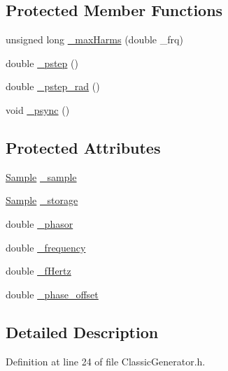\subsection*{Protected Member Functions}
\begin{DoxyCompactItemize}
\item 
unsigned long \hyperlink{classSignal_1_1ClassicGenerator_a7457e912d428de4e3fc27ec7fc49890e}{\+\_\+max\+Harms} (double \+\_\+frq)
\item 
double \hyperlink{classSignal_1_1ClassicGenerator_a255330ce8049b6e6d101b8d356cebe3d}{\+\_\+pstep} ()
\item 
double \hyperlink{classSignal_1_1ClassicGenerator_a6571276f584ff0be3862243d0f103a92}{\+\_\+pstep\+\_\+rad} ()
\item 
void \hyperlink{classSignal_1_1ClassicGenerator_a6454565b655bff7b8335735c2fabb4af}{\+\_\+psync} ()
\end{DoxyCompactItemize}
\subsection*{Protected Attributes}
\begin{DoxyCompactItemize}
\item 
\hyperlink{classSignal_1_1Sample}{Sample} \hyperlink{classSignal_1_1ClassicGenerator_a40313d0d806d6e44af7d41b3ef3a0822}{\+\_\+sample}
\item 
\hyperlink{classSignal_1_1Sample}{Sample} \hyperlink{classSignal_1_1ClassicGenerator_a1214faf589eccb01631700723900bbf9}{\+\_\+storage}
\item 
double \hyperlink{classSignal_1_1ClassicGenerator_ade9b66bc49d2d2f40a1390fc6374b8b2}{\+\_\+phasor}
\item 
double \hyperlink{classSignal_1_1SignalGenerator_a7f107461333bce68c5dad412db96a8c2}{\+\_\+frequency}
\item 
double \hyperlink{classSignal_1_1SignalGenerator_a85a4702347352bab1c71e0a8df8437d6}{\+\_\+f\+Hertz}
\item 
double \hyperlink{classSignal_1_1SignalGenerator_a6b4444d46747c8517171edbbf4b5588f}{\+\_\+phase\+\_\+offset}
\end{DoxyCompactItemize}


\subsection{Detailed Description}


Definition at line 24 of file Classic\+Generator.\+h.



